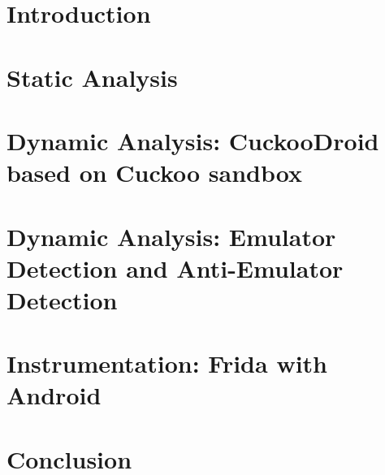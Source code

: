 \documentclass{report}
\begin{document}
	
	\pagebreak
	
	\pagebreak
	
	\pagebreak
	
	\pagebreak
	
	\pagebreak
	
	
	\tableofcontents
	\cleardoublepage
	\chapter{Introduction}\label{sec:intro}
		
		\pagebreak
	\chapter{Static Analysis}\label{sec:static_analysis}
		
		\pagebreak
	\chapter{Dynamic Analysis: CuckooDroid based on Cuckoo sandbox}\label{sec:cuckoodroid}
		
		\pagebreak
	
	\chapter{Dynamic Analysis: Emulator Detection and Anti-Emulator Detection} \label{sec:Chp4}
		
		\pagebreak
	
	\chapter{Instrumentation: Frida with Android} \label{sec:Chp5}
		
		\pagebreak

	\chapter{Conclusion} \label{conclusion}
		
		\pagebreak



	
	
	\pagebreak
	
	\pagebreak
	
	\pagebreak
	
	\pagebreak

	
	\pagebreak
	
\end{document}
